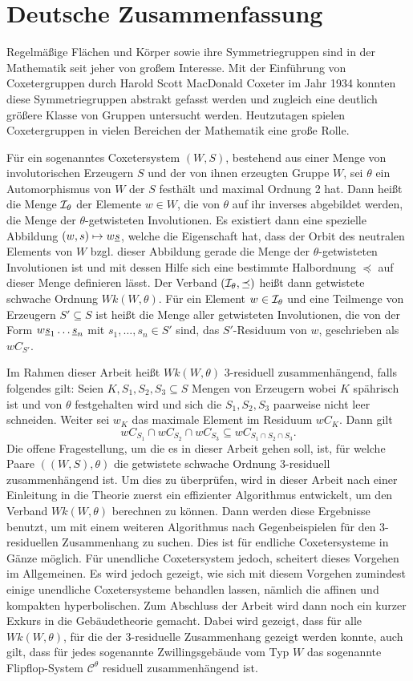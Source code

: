 \chapter*{Deutsche Zusammenfassung}

Regelmäßige Flächen und Körper sowie ihre Symmetriegruppen sind in der Mathematik seit jeher von großem Interesse. Mit der Einführung von Coxetergruppen durch Harold Scott MacDonald Coxeter im Jahr 1934 konnten diese Symmetriegruppen abstrakt gefasst werden und zugleich eine deutlich größere Klasse von Gruppen untersucht werden. Heutzutagen spielen Coxetergruppen in vielen Bereichen der Mathematik eine große Rolle.

Für ein sogenanntes Coxetersystem $(W,S)$, bestehend aus einer Menge von involutorischen Erzeugern $S$ und der von ihnen erzeugten Gruppe $W$, sei $\theta$ ein Automorphismus von $W$ der $S$ festhält und maximal Ordnung 2 hat. Dann heißt die Menge $\mathcal{I}_{\theta}$ der Elemente $w \in W$, die von $\theta$ auf ihr inverses abgebildet werden, die Menge der $\theta$-getwisteten Involutionen. Es existiert dann eine spezielle Abbildung $(w,s) \mapsto w \underline{s}$, welche die Eigenschaft hat, dass der Orbit des neutralen Elements von $W$ bzgl. dieser Abbildung gerade die Menge der $\theta$-getwisteten Involutionen ist und mit dessen Hilfe sich eine bestimmte Halbordnung $\preceq$ auf dieser Menge definieren lässt. Der Verband $(\mathcal{I}_{\theta},\preceq)$ heißt dann getwistete schwache Ordnung $Wk(W,\theta)$. Für ein Element $w \in \mathcal{I}_{\theta}$ und eine Teilmenge von Erzeugern $S' \subseteq S$ ist heißt die Menge aller getwisteten Involutionen, die von der Form $w \underline{s}_1 \ldots \underline{s}_n$ mit $s_1,\ldots,s_n \in S'$ sind, das $S'$-Residuum von $w$, geschrieben als $w C_{S'}$.

Im Rahmen dieser Arbeit heißt $Wk(W,\theta)$ 3-residuell zusammenhängend, falls folgendes gilt: Seien $K,S_1,S_2,S_3 \subseteq S$ Mengen von Erzeugern wobei $K$ spährisch ist und von $\theta$ festgehalten wird und sich die $S_1,S_2,S_3$ paarweise nicht leer schneiden. Weiter sei $w_K$ das maximale Element im Residuum $w C_K$. Dann gilt
$$ w C_{S_1} \cap w C_{S_2} \cap w C_{S_3} \subseteq w C_{S_1 \cap S_2 \cap S_3}. $$
Die offene Fragestellung, um die es in dieser Arbeit gehen soll, ist, für welche Paare $((W,S),\theta)$ die getwistete schwache Ordnung 3-residuell zusammenhängend ist. Um dies zu überprüfen, wird in dieser Arbeit nach einer Einleitung in die Theorie zuerst ein effizienter Algorithmus entwickelt, um den Verband $Wk(W,\theta)$ berechnen zu können. Dann werden diese Ergebnisse benutzt, um mit einem weiteren Algorithmus nach Gegenbeispielen für den 3-residuellen Zusammenhang zu suchen. Dies ist für endliche Coxetersysteme in Gänze möglich. Für unendliche Coxetersystem jedoch, scheitert dieses Vorgehen im Allgemeinen. Es wird jedoch gezeigt, wie sich mit diesem Vorgehen zumindest einige unendliche Coxetersysteme behandlen lassen, nämlich die affinen und kompakten hyperbolischen. Zum Abschluss der Arbeit wird dann noch ein kurzer Exkurs in die Gebäudetheorie gemacht. Dabei wird gezeigt, dass für alle $Wk(W,\theta)$, für die der 3-residuelle Zusammenhang gezeigt werden konnte, auch gilt, dass für jedes sogenannte Zwillingsgebäude vom Typ $W$ das sogenannte Flipflop-System $\mathcal{C}^\theta$ residuell zusammenhängend ist.
